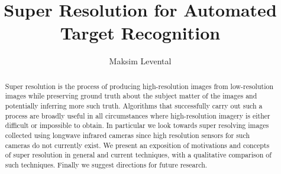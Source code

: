 \documentclass[journal]{IEEEtran}
\begin{document}
\title{Super Resolution for Automated Target Recognition}
\author{Maksim Levental}
\maketitle

\begin{abstract}
	Super resolution is the process of producing high-resolution images from low-resolution images while preserving ground truth about the subject matter of the images and potentially inferring more such truth.
	Algorithms that successfully carry out such a process are broadly useful in all circumstances where high-resolution imagery is either difficult or impossible to obtain.
	In particular we look towards super resolving images collected using longwave infrared cameras since high resolution sensors for such cameras do not currently exist.
	We present an exposition of motivations and concepts of super resolution in general and current techniques, with a qualitative comparison of such techniques.
	Finally we suggest directions for future research.
\end{abstract}
\tableofcontents

% 

% 

% 

% 



%
%
%
%
\newpage
\printbibliography
\end{document}
